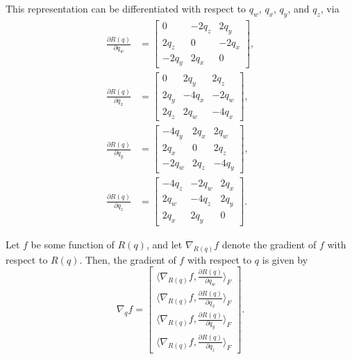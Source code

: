 This representation can be differentiated with respect to $q_w$, $q_x$, $q_y$, and $q_z$, via
\begin{align}
    \frac{\partial R(q)}{\partial q_w}
    &= \begin{bmatrix}
        0 & -2q_z & 2q_y \\
        2q_z & 0 & -2q_x \\
        -2q_y & 2q_x & 0
    \end{bmatrix},
    \\
    \frac{\partial R(q)}{\partial q_x}
    &= \begin{bmatrix}
        0 & 2q_y & 2q_z \\
        2q_y & -4 q_x & -2q_w \\
        2q_z & 2q_w & -4q_x
    \end{bmatrix},
    \\
    \frac{\partial R(q)}{\partial q_y}
    &= \begin{bmatrix}
        -4q_y & 2q_x & 2q_w \\
        2q_x & 0 & 2q_z \\
        -2q_w & 2q_z & -4q_y
    \end{bmatrix},
    \\
    \frac{\partial R(q)}{\partial q_z}
    &= \begin{bmatrix}
        -4q_z & -2q_w & 2q_x \\
        2q_w & -4q_z & 2q_y \\
        2q_x & 2q_y & 0
    \end{bmatrix}.
\end{align}

Let $f$ be some function of $R(q)$, and let $\nabla_{R(q)} f$ denote the gradient of $f$ with respect to $R(q)$.
Then, the gradient of $f$ with respect to $q$ is given by
\begin{equation}
    \nabla_q f = \begin{bmatrix}
        \langle \nabla_{R(q)} f, \frac{\partial R(q)}{\partial q_w} \rangle_F
        \\
        \langle \nabla_{R(q)} f, \frac{\partial R(q)}{\partial q_x} \rangle_F
        \\
        \langle \nabla_{R(q)} f, \frac{\partial R(q)}{\partial q_y} \rangle_F
        \\
        \langle \nabla_{R(q)} f, \frac{\partial R(q)}{\partial q_z} \rangle_F
    \end{bmatrix}.
\end{equation}

